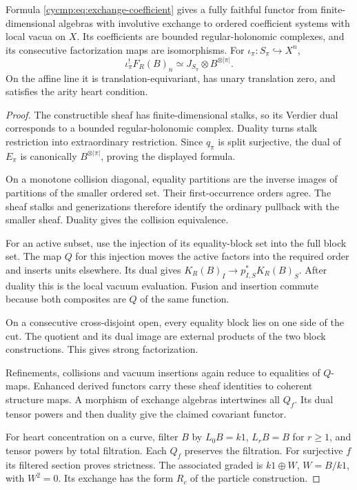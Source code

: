 \begin{theorem}\label{cycmp:thm:exchange-reconstruction}
Formula \eqref{cycmp:eq:exchange-coefficient} gives a fully faithful
functor from finite-dimensional algebras with involutive exchange to
ordered coefficient systems with local vacua on $X$.
Its coefficients are bounded regular-holonomic complexes, and its
consecutive factorization maps are isomorphisms. For
$\iota_\pi:S_\pi\hookrightarrow X^n$,
\[
 \iota_\pi^!F_R(B)_n\simeq J_{S_\pi}\otimes B^{\otimes|\pi|}.
\]
On the affine line it is translation-equivariant, has unary translation
zero, and satisfies the arity heart condition.
\end{theorem}

\begin{proof}
The constructible sheaf has finite-dimensional stalks, so its Verdier
dual corresponds to a bounded regular-holonomic complex. Duality
turns stalk restriction into extraordinary restriction. Since
$q_\pi$ is split surjective, the dual of $E_\pi$ is canonically
$B^{\otimes|\pi|}$, proving the displayed formula.

On a monotone collision diagonal, equality partitions are the inverse
images of partitions of the smaller ordered set. Their first-occurrence
orders agree. The sheaf stalks and generizations therefore identify
the ordinary pullback with the smaller sheaf. Duality gives the
collision equivalence.

For an active subset, use the injection of
its equality-block set into the full block set. The map $Q$ for this
injection moves the active factors into the required order and inserts
units elsewhere. Its dual gives
$K_R(B)_I\to p_{I,S}^*K_R(B)_S$. After duality this is the local
vacuum evaluation. Fusion and insertion commute because both
composites are $Q$ of the same function.

On a consecutive cross-disjoint open, every equality block lies on
one side of the cut. The quotient and its dual image are external
products of the two block constructions. This gives strong
factorization.

Refinements, collisions and vacuum insertions again
reduce to equalities of $Q$-maps. Enhanced derived functors carry
these sheaf identities to coherent structure maps. A morphism of
exchange algebras intertwines all $Q_f$. Its dual tensor powers and
then duality give the claimed covariant functor.

For heart concentration on a curve, filter $B$ by
$L_0B=k1$, $L_rB=B$ for $r\ge1$, and tensor powers by total
filtration. Each $Q_f$ preserves the filtration. For surjective $f$
its filtered section proves strictness. The associated graded is
$k1\oplus W$, $W=B/k1$, with $W^2=0$. Its exchange has the form
$R_c$ of the particle construction.


\end{proof}
